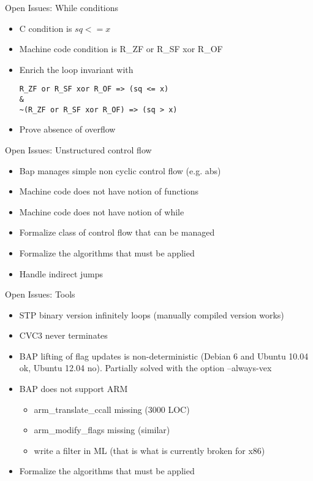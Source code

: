 \documentclass{beamer}
\begin{document}
\begin{frame}[fragile]{Open Issues: While conditions}
\begin{itemize}
  \item C condition is $sq<=x$
  \item Machine code condition is R\_ZF or R\_SF xor R\_OF
  \item Enrich the loop invariant with
  \begin{lstlisting}
R_ZF or R_SF xor R_OF => (sq <= x)
&
~(R_ZF or R_SF xor R_OF) => (sq > x)
  \end{lstlisting}
  \item Prove absence of overflow
\end{itemize}
\end{frame}

\begin{frame}[fragile]{Open Issues: Unstructured control flow}
\begin{itemize}
  \item Bap manages simple non cyclic control flow (e.g. abs)
  \item Machine code does not have notion of functions
  \item Machine code does not have notion of while
  \item Formalize class of control flow that can be managed
  \item Formalize the algorithms that must be applied
  \item Handle indirect jumps
\end{itemize}
\end{frame}

\begin{frame}[fragile]{Open Issues: Tools}
\begin{itemize}
  \item STP binary version infinitely loops (manually compiled version works)
  \item CVC3 never terminates
  \item BAP lifting of flag updates is non-deterministic (Debian 6 and Ubuntu 10.04 ok, Ubuntu 12.04 no). Partially solved with the option --always-vex
  \item BAP does not support ARM
  \begin{itemize}
    \item arm\_translate\_ccall missing (3000 LOC)
    \item arm\_modify\_flags missing (similar)
    \item write a filter in ML (that is what is currently broken for x86)
  \end{itemize}
  \item Formalize the algorithms that must be applied
\end{itemize}
\end{frame}
\end{document}
